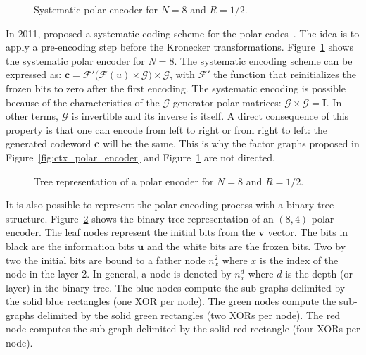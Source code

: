 \begin{figure}[htp]
  \centering
  \caption{Systematic polar encoder for $N = 8$ and $R = 1/2$.}
  \label{fig:ctx_polar_encoder_sys}
\end{figure}

In 2011, \Arikan proposed a systematic coding scheme for the polar
codes~\cite{Arikan2011}. The idea is to apply a pre-encoding step before the
Kronecker transformations. Figure~\ref{fig:ctx_polar_encoder_sys} shows the
systematic polar encoder for $N = 8$. The systematic encoding scheme can be
expressed as: $\bm{c} = \mathcal{F'}\big(\mathcal{F}(u) \times
\bm{\mathcal{G}}\big) \times \bm{\mathcal{G}}$, with $\mathcal{F'}$ the function
that reinitializes the frozen bits to zero after the first encoding. The
systematic encoding is possible because of the characteristics of the
$\bm{\mathcal{G}}$ generator polar matrices: $\bm{\mathcal{G}} \times
\bm{\mathcal{G}} = \bm{I}$. In other terms, $\bm{\mathcal{G}}$ is invertible and
its inverse is itself. A direct consequence of this property is that one can
encode from left to right or from right to left: the generated codeword $\bm{c}$
will be the same. This is why the factor graphs proposed in
Figure~\ref{fig:ctx_polar_encoder} and Figure~\ref{fig:ctx_polar_encoder_sys}
are not directed.

\begin{figure}[htp]
  \centering
  \caption{Tree representation of a polar encoder for $N = 8$ and $R = 1/2$.}
  \label{fig:ctx_polar_tree}
\end{figure}

It is also possible to represent the polar encoding process with a binary tree
structure. Figure~\ref{fig:ctx_polar_tree} shows the binary tree representation
of an $(8,4)$ polar encoder. The leaf nodes represent the initial bits from the
$\bm{v}$ vector. The bits in black are the information bits $\bm{u}$ and the
white bits are the frozen bits. Two by two the initial bits are bound to a
father node $n_x^2$ where $x$ is the index of the node in the layer 2. In
general, a node is denoted by $n_x^d$ where $d$ is the depth (or layer) in the
binary tree. The {\color{Paired-1} blue} nodes compute the sub-graphs delimited
by the solid {\color{Paired-1} blue} rectangles (one XOR per node). The
{\color{Paired-3} green} nodes compute the sub-graphs delimited by the solid
{\color{Paired-3} green} rectangles (two XORs per node). The {\color{Paired-5}
red} node computes the sub-graph delimited by the solid {\color{Paired-5} red}
rectangle (four XORs per node).

